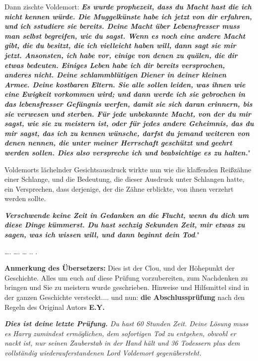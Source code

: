 Dann zischte Voldemort: \glqq \textbf{\emph{Es wurde prophezeit, dass du Macht
hast die ich nicht kennen würde. Die Muggelkünste habe ich jetzt von dir
erfahren, und ich sstudiere sie bereits. Deine Macht über Lebensfresser muss man
selbst begreifen, wie du sagst. Wenn es noch eine andere Macht gibt, die du
besitzt, die ich vielleicht haben will, dann sagt sie mir jetzt. Ansonsten, ich
habe vor, einige von denen zu quälen, die dir etwas bedeuten. Einiges Leben habe
ich dir bereits versprochen, anderes nicht. Deine schlammblütigen Diener in
deiner kleinen Armee. Deine kostbaren Eltern. Sie alle sollen leiden, was ihnen
wie eine Ewigkeit vorkommen wird; und dann werde ich sie gebrochen in das
lebensfresser Gefängnis werfen, damit sie sich daran erinnern, bis sie verwesen
und sterben. Für jede unbekannte Macht, von der du mir sagst, wie sie zu
meistern ist, oder für jedes andere Geheimnis, das du mir sagst, das ich zu
kennen wünsche, darfst du jemand weiteren von denen nennen, die unter meiner
Herrschaft geschützt und geehrt werden sollen. Dies also verspreche ich und
beabsichtige es zu halten.}}"

Voldemorts lächelnder Gesichtsausdruck wirkte nun wie die klaffenden Reißzähne
einer Schlange, und die Bedeutung, die dieser Ausdruck unter Schlangen hatte,
ein Versprechen, dass derjenige, der die Zähne erblickte, von ihnen verzehrt
werden sollte.

\glqq \textbf{\emph{Verschwende keine Zeit in Gedanken an die Flucht, wenn du
dich um diese Dinge kümmerst. Du hast sechzig Sekunden Zeit, mir etwas zu sagen,
was ich wissen will, und dann beginnt dein Tod}}."

…. …. … .. .

\textbf{Anmerkung des Übersetzers:}
Dies ist der Clou, und der Höhepunkt der Geschichte. Alles um euch auf diese
Prüfung vorzubereiten, zum Nachdenken zu bringen und Sie zu meistern wurde
geschrieben. Hinweise und Hilfsmittel sind in der ganzen Geschichte
versteckt.... und nun: \textbf{die Abschlussprüfung} nach den Regeln des
Original Autors\textbf{ E.Y.}



\emph{
\textbf{Dies ist deine letzte Prüfung.}
Du hast 60 Stunden Zeit. Deine Lösung muss es Harry zumindest ermöglichen, dem
sofortigen Tod zu entgehen, obwohl er nackt ist, nur seinen Zauberstab in der
Hand hält und 36 Todessern plus dem vollständig wiederauferstandenen Lord
Voldemort gegenübersteht.}

